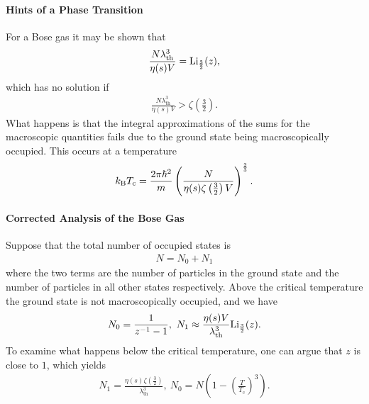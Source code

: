 \paragraph{Hints of a Phase Transition}
For a Bose gas it may be shown that
\begin{align*}
	\frac{N\lambda_{\text{th}}^{3}}{\eta(s)V} = \text{Li}_{\frac{3}{2}}(z),
\end{align*}
which has no solution if
\begin{align*}
	\frac{N\lambda_{\text{th}}^{3}}{\eta(s)V} > \zeta\left(\frac{3}{2}\right).
\end{align*}
What happens is that the integral approximations of the sums for the macroscopic quantities fails due to the ground state being macroscopically occupied. This occurs at a temperature
\begin{align*}
	k_{\text{B}} T_{\text{c}} = \frac{2\pi\hbar^{2}}{m}\left(\frac{N}{\eta(s)\zeta\left(\frac{3}{2}\right)V}\right)^{\frac{2}{3}}.
\end{align*}

\paragraph{Corrected Analysis of the Bose Gas}
Suppose that the total number of occupied states is
\begin{align*}
	N = N_{0} + N_{1}
\end{align*}
where the two terms are the number of particles in the ground state and the number of particles in all other states respectively. Above the critical temperature the ground state is not macroscopically occupied, and we have
\begin{align*}
	N_{0} = \frac{1}{z^{-1} - 1},\ N_{1} \approx \frac{\eta(s)V}{\lambda_{\text{th}}^{3}}\text{Li}_{\frac{3}{2}}(z).
\end{align*}
To examine what happens below the critical temperature, one can argue that $z$ is close to $1$, which yields
\begin{align*}
	N_{1} = \frac{\eta(s)\zeta\left(\frac{3}{2}\right)}{\lambda_{\text{th}}^{3}},\ N_{0} = N\left(1 - \left(\frac{T}{T_{\text{c}}}\right)^{3}\right).
\end{align*}


